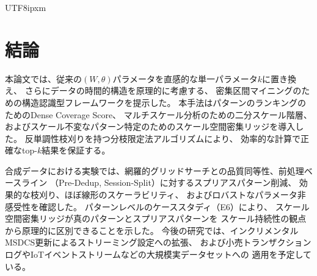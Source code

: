 \documentclass[conference]{IEEEtran}
\begin{document}
\begin{CJK}{UTF8}{ipxm}
\section{結論}\label{sec:conclusion}

本論文では、従来の$(W, \theta)$パラメータを直感的な単一パラメータ$k$に置き換え、
さらにデータの時間的構造を原理的に考慮する、
密集区間マイニングのための構造認識型フレームワークを提示した。
本手法はパターンのランキングのためのDense Coverage Score、
マルチスケール分析のための二分スケール階層、
およびスケール不変なパターン特定のためのスケール空間密集リッジを導入した。
反単調性枝刈りを持つ分枝限定法アルゴリズムにより、
効率的な計算で正確なtop-$k$結果を保証する。

合成データにおける実験では、網羅的グリッドサーチとの品質同等性、前処理ベースライン
（Pre-Dedup, Session-Split）に対するスプリアスパターン削減、
効果的な枝刈り、ほぼ線形のスケーラビリティ、
およびロバストなパラメータ非感受性を確認した。
パターンレベルのケーススタディ（E6）により、
スケール空間密集リッジが真のパターンとスプリアスパターンを
スケール持続性の観点から原理的に区別できることを示した。
今後の研究では、インクリメンタルMSDCS更新によるストリーミング設定への拡張、
および小売トランザクションログやIoTイベントストリームなどの大規模実データセットへの
適用を予定している。




\end{CJK}
\end{document}
